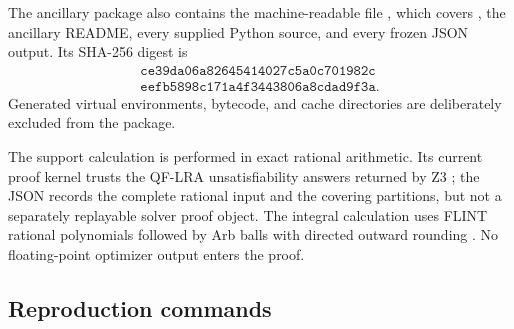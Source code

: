 The ancillary package also contains the machine-readable file
, which covers , the ancillary
README, every supplied Python source, and every frozen JSON output.  Its
SHA-256 digest is
\[
 \begin{gathered}
 \mathtt{ce39da06a82645414027c5a0c701982c}\\
 \mathtt{eefb5898c171a4f3443806a8cdad9f3a}.
 \end{gathered}
\]
Generated virtual environments, bytecode, and cache directories are
deliberately excluded from the package.

The support calculation is performed in exact rational arithmetic.  Its
current proof kernel trusts the QF-LRA unsatisfiability answers returned by
Z3 \cite{Z3}; the JSON records the complete rational input and the covering
partitions, but not a separately replayable solver proof object.  The
integral calculation uses FLINT rational polynomials \cite{FLINT} followed by
Arb balls with directed outward rounding \cite{Arb}.  No floating-point
optimizer output enters the proof.

\subsection{Reproduction commands}

